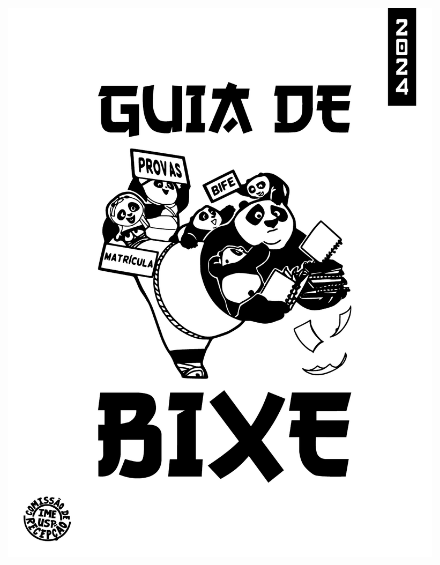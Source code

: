 \documentclass[12pt]{report}
\begin{document}
\begin{figure}[p]
    \includegraphics[height=1\textheight]{img/capa2024.pdf} %
\end{figure}
\thispagestyle{empty} %
\clearpage
\newpage







\end{document}
